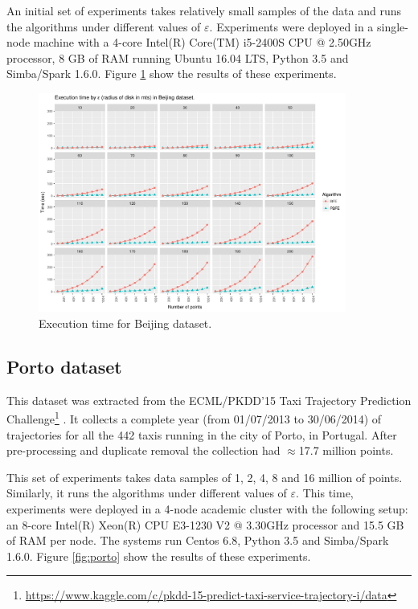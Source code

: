 \documentclass[12pt]{scrartcl}
\begin{document}
An initial set of experiments takes relatively small samples of the data and runs the algorithms under different values of $\varepsilon$. Experiments were deployed in a single-node machine with a 4-core Intel(R) Core(TM) i5-2400S CPU @ 2.50GHz processor, 8 GB of RAM running Ubuntu 16.04 LTS, Python 3.5 and Simba/Spark 1.6.0.  Figure \ref{fig:beijing} show the results of these experiments.

\begin{figure}
 \centering
 \includegraphics[width=0.9\textwidth]{figures/beijing} 
 \caption{Execution time for Beijing dataset.}
 \label{fig:beijing}
\end{figure}

\subsection{Porto dataset}
This dataset was extracted from the ECML/PKDD'15 Taxi Trajectory Prediction Challenge\footnote{\url{https://www.kaggle.com/c/pkdd-15-predict-taxi-service-trajectory-i/data}} \cite{lam_blue_2015, moreira-matias_predicting_2013}.  It collects a complete year (from 01/07/2013 to 30/06/2014) of trajectories for all the 442 taxis running in the city of Porto, in Portugal. After pre-processing and duplicate removal the collection had $\approx$17.7 million points.

This set of experiments takes data samples of 1, 2, 4, 8 and 16 million of points.  Similarly, it runs the algorithms under different values of $\varepsilon$.  This time, experiments were deployed in a 4-node academic cluster with the following setup: an 8-core Intel(R) Xeon(R) CPU E3-1230 V2 @ 3.30GHz processor and 15.5 GB of RAM per node.  The systems run Centos 6.8, Python 3.5 and Simba/Spark 1.6.0.  Figure \ref{fig:porto} show the results of these experiments.
\end{document}
